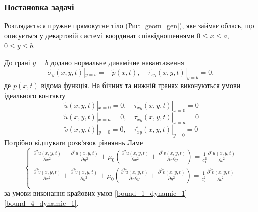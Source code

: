 \subsubsection{Постановка задачі}
Розглядається пружне прямокутне тіло (Рис: \ref{geom_gen}), яке займає облась,
що описується у декартовій системі координат співвідношеннями $0 \le x \le a$, $0 \le y \le b$.

До грані $y=b$ додано нормальне динамічне навантаження
\begin{equation}\label{bound_1_dynamic_1}
    \widetilde{\sigma_y}(x, y, t) |_{y=b} = -\widetilde{p}(x, t), \quad  \widetilde{\tau_{xy}}(x,y,t) |_{y=b} =0,
\end{equation}
де $p(x,t)$ відома функція.
На бічних та нижній гранях виконуються умови ідеального контакту
\begin{equation}\label{bound_2_dynamic_1}
    \widetilde{u}(x,y,t) |_{x=0} = 0, \quad \widetilde{\tau_{xy}}(x,y,t) |_{x=0} =0
\end{equation}
\begin{equation}\label{bound_3_dynamic_1}
    \widetilde{u}(x,y,t) |_{x=a} = 0, \quad \widetilde{\tau_{xy}}(x,y,t) |_{x=a} =0
\end{equation}
\begin{equation}\label{bound_4_dynamic_1}
    \widetilde{v}(x,y,t) |_{y=0} = 0, \quad \widetilde{\tau_{xy}}(x,y,t) |_{y=0} =0
\end{equation}
Потрібно відшукати розв'язок рівняннь Ламе
\begin{equation}
    \begin{cases}
        \frac{\partial^2 \widetilde{u}(x,y,t)}{\partial x^2} + \frac{\partial^2 \widetilde{u}(x,y,t)}{\partial y^2} + \mu_0 (\frac{\partial^2 \widetilde{u}(x,y,t)}{\partial x^2} + \frac{\partial^2 \widetilde{v}(x,y,t)}{\partial x\partial y}) = \frac{1}{c_1^2} \frac{\partial^2 \widetilde{u}(x,y,t)}{\partial t^2} \\
        \frac{\partial^2 \widetilde{v}(x,y,t)}{\partial x^2} + \frac{\partial^2 \widetilde{v}(x,y,t)}{\partial y^2} + \mu_0 (\frac{\partial^2 \widetilde{u}(x,y,t)}{\partial x \partial y} + \frac{\partial^2 \widetilde{v}(x,y,t)}{\partial y^2}) = \frac{1}{c_2^2} \frac{\partial^2 \widetilde{v}(x,y,t)}{\partial t^2} \\
    \end{cases}
\end{equation}
за умови виконання крайових умов \eqref{bound_1_dynamic_1} - \eqref{bound_4_dynamic_1}.

